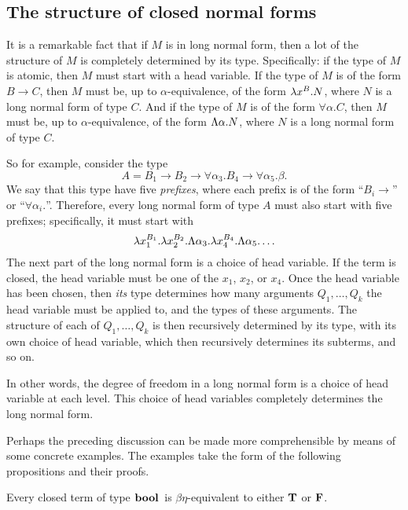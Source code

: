 \documentclass{article}
\begin{document}
\subsection{The structure of closed normal forms}

It is a remarkable fact that if $M$ is in long normal form, then a lot
of the structure of $M$ is completely determined by its type.
Specifically: if the type of $M$ is atomic, then $M$ must start with a
head variable. If the type of $M$ is of the form $B\to C$, then $M$
must be, up to $\alpha$-equivalence, of the form $\lambda x^{B}.N$,
where $N$ is a long normal form of type $C$. And if the type of $M$ is
of the form $\forall\alpha.C$, then $M$ must be, up to
$\alpha$-equivalence, of the form $\Lambda\alpha.N$, where $N$ is a
long normal form of type $C$. 

So for example, consider the type 
\[ A=B_1\to B_2\to\forall \alpha_3. B_4\to\forall\alpha_5.\beta.
\]
We say that this type have five {\em prefixes}, where each prefix is
of the form ``$B_i\to$'' or ``$\forall\alpha_i.$''. Therefore, every
long normal form of type $A$ must also start with five prefixes;
specifically, it must start with 
\[ \lambda x_1^{B_1}.\lambda x_2^{B_2}.\Lambda\alpha_3.\lambda x_4^{B_4}.\Lambda\alpha_5.\ldots
\]
The next part of the long normal form is a choice of head variable. If
the term is closed, the head variable must be one of the $x_1$, $x_2$,
or $x_4$. Once the head variable has been chosen, then {\em its} type
determines how many arguments $Q_1,\ldots,Q_k$ the head variable must
be applied to, and the types of these arguments. The structure of each
of $Q_1,\ldots,Q_k$ is then recursively determined by its type, with
its own choice of head variable, which then recursively determines its
subterms, and so on. 

In other words, the degree of freedom in a long normal form is a
choice of head variable at each level. This choice of head variables
completely determines the long normal form.

Perhaps the preceding discussion can be made more comprehensible by
means of some concrete examples. The examples take the form of the
following propositions and their proofs.

\begin{proposition}\label{prop-unique-bool}
  Every closed term of type $\mathop{\textbf{\bf bool}\,}$ is $\beta\eta$-equivalent to
  either ${\bf T}$ or ${\bf F}$.
\end{proposition}
\end{document}
